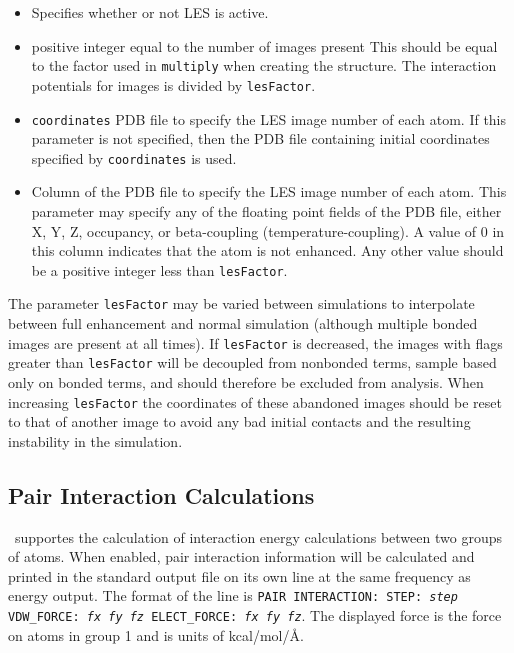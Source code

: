 \begin{itemize}

\item
{}
{Specifies whether or not LES is active.}

\item
{}
{positive integer equal to the number of images present}
{This should be equal to the factor used in {\tt multiply}
 when creating the structure.  The interaction potentials for images is
 divided by {\tt lesFactor}.  
}

\item
{} {{\tt coordinates}}
{PDB file to specify the LES image number of each atom.
If this parameter is not specified, then 
the PDB file containing initial coordinates specified by 
{\tt coordinates} is used.}

\item
{}
{Column of the PDB file to specify the LES image number of each atom.
This parameter may specify any of the floating point fields of the PDB file, 
either X, Y, Z, occupancy, or beta-coupling (temperature-coupling).  
A value of 0 in this column indicates that the atom is not enhanced.
Any other value should be a positive integer less than {\tt lesFactor}.}

\end{itemize}

The parameter {\tt lesFactor} may be varied between simulations to
interpolate between full enhancement and normal simulation (although
multiple bonded images are present at all times).  If {\tt lesFactor}
is decreased, the images with flags greater than {\tt lesFactor} will
be decoupled from nonbonded terms, sample based only on bonded terms,
and should therefore be excluded from analysis.  When increasing
{\tt lesFactor} the coordinates of these abandoned images should be
reset to that of another image to avoid any bad initial contacts and
the resulting instability in the simulation.

\subsection{Pair Interaction Calculations}
\label{section:pairinteraction}
\NAMD\ supportes the calculation of interaction energy calculations between 
two groups of atoms.  When enabled, pair interaction information will be
calculated and printed in the standard output file on its own line at the
same frequency as energy output.  The format of the line is
{\tt PAIR INTERACTION: STEP: {\it step} VDW\_FORCE: {\it fx fy fz} 
ELECT\_FORCE: {\it fx fy fz}}.
The displayed force is the force on atoms in group 1 and is units of 
kcal/mol/\AA. 

